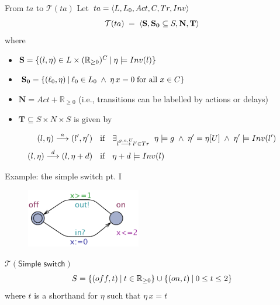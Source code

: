 \documentclass{beamer}
\def\TL#1{\mathcal{T}(#1)}
\begin{document}
\begin{slide}{From $ta$ to $\TL{ta}$}
\small
Let $ta = \mathopen{\langle}L, L_0, Act, C, Tr, Inv\mathclose{\rangle}$
\begin{equation*}
        \TL{ta}\; =\; \pair{\mathbf{S}, \mathbf{S_0} \subseteq S, \mathbf{N}, 
        \mathbf{T}}
\end{equation*}
where
\begin{itemize}
\item
        $\mathbf{S} = \mathopen{\{} (l,\eta) \in L \times
    (\mathbb{R}_{\geq 0})^C \mathbin{|} \eta \models Inv(l) \mathclose{\}}$
\item
        $\mathbf{S_0} = \mathopen{\{} (\ell_0,\eta) \mathbin{|} \ell_0 \in L_0\; \mathbin{\wedge}\;
    \eta\, x = 0\; \text{for all $x \in C$} \mathclose{\}}$
\item $\textbf{N} = Act + \mathbb{R}_{\geq 0}$ (i.e., transitions can be
    labelled by actions or delays)
\item $\textbf{T} \subseteq S \times N \times S$ is given by
\end{itemize}
\begin{align*}
(l,\eta) \stackrel{a}{\longrightarrow} (l',\eta')\; & ~~\text{if}~~\; 
\exists_{l \stackrel{g,a,U}{\longrightarrow} l' \in Tr}  \; \; \eta \models g \; \mathbin{\wedge}\; \eta' = \eta[U] \; \mathbin{\wedge}\; \eta' \models Inv(l')\\
(l,\eta) \stackrel{d}{\longrightarrow} (l,\eta +d)\; & ~~\text{if}~~\; 
\eta + d \models Inv(l)
\end{align*}
\end{slide}
\begin{slide}{Example: the simple switch pt. I}
\small
\begin{figure}[htb]
  \centering
  \includegraphics[width=5cm]{./images/SwitchA.pdf}\\
\end{figure}

\vfill
\begin{block}{$\TL{\textsf{Simple switch}}$}
\begin{equation*}
S = \mathopen{\{} (off,t) \mathbin{|} t \in \mathbb{R}_{\geq 0} \mathclose{\}} \cup \mathopen{\{} (on,t) \mathbin{|} 0 \leq t \leq 2 \mathclose{\}} 
\end{equation*}
where $t$ is a shorthand for $\eta$ such that $\eta\, x = t$
\end{block}
\end{slide}
\end{document}

